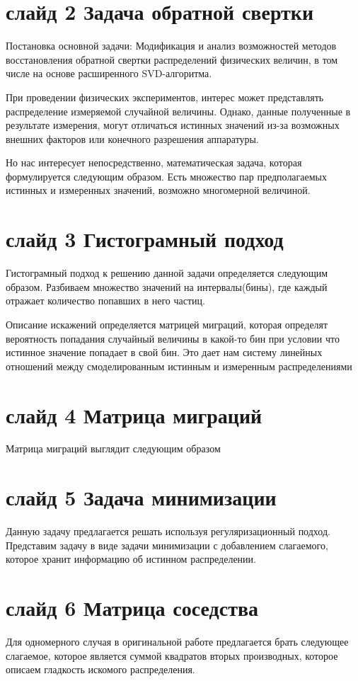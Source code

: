 \documentclass[a4paper,12pt]{diplom}
\begin{document}
\section*{слайд 2  Задача обратной свертки}

Постановка основной задачи: Модификация и анализ возможностей методов восстановления обратной свертки распределений физических величин, 
в том числе на основе расширенного SVD-алгоритма.

При проведении физических экспериментов, интерес может представлять распределение измеряемой случайной величины. Однако, данные 
полученные в результате измерения, могут отличаться  истинных значений из-за возможных внешних факторов или конечного разрешения 
аппаратуры. 

Но нас интересует непосредственно, математическая задача, которая формулируется следующим образом. Есть множество пар предполагаемых 
истинных и измеренных значений, возможно многомерной величиной.

\section*{слайд 3 Гистограмный подход}
Гистограмный подход к решению данной задачи определяется следующим образом. Разбиваем множество значений на интервалы(бины), где 
каждый отражает количество попавших в него частиц.

Описание искажений определяется матрицей миграций, которая
определят вероятность попадания случайный величины в какой-то бин
при условии что истинное значение попадает в свой бин. Это дает нам
систему линейных отношений между смоделированным истинным и
измеренным распределениями


\section*{слайд 4 Матрица миграций}
Матрица миграций выглядит следующим образом


\section*{слайд 5 Задача минимизации}
Данную задачу предлагается решать используя регуляризационный подход. Представим задачу в виде задачи минимизации с добавлением 
слагаемого, которое хранит информацию об истинном распределении.

\section*{слайд 6 Матрица соседства}
Для одномерного случая в оригинальной работе предлагается брать следующее слагаемое, которое является суммой квадратов вторых 
производных, которое описаем гладкость искомого распределения.
\end{document}
